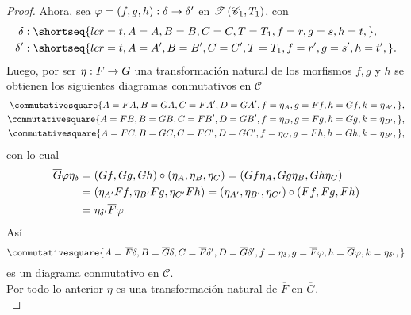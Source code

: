 \documentclass{article}
\begin{document}
\begin{enumerate}[label=\textbf{Ej \arabic*.}]
\begin{proof}
	 		Ahora, sea $\catarrow{\varphi=\lrprth{f,g,h}}{\delta}{\delta'}{}$ en $\mathscr{T}\left(\mathscr{C}_1,T_1\right)$, con 
	 		\begin{align*}
	 			\delta&:\shortseq{lcr=t,A=A,B=B,C=C,T=T_1,f=r,g=s,h=t,},\\
	 			\delta'&:\shortseq{lcr=t,A=A',B=B',C=C',T=T_1,f=r',g=s',h=t',}.
	 		\end{align*}
 			Luego, por ser $\catarrow{\eta}{F}{G}{}$ una transformación natural de los morfismos $f,g$ y $h$ se obtienen los siguientes diagramas conmutativos en $\mathscr{C}$
 			\begin{align*}
 				\commutativesquare{A=FA,B=GA,C=FA',D=GA',f=\eta_A,g=Ff,h=Gf,k=\eta_{A'},}&,\\
 				\commutativesquare{A=FB,B=GB,C=FB',D=GB',f=\eta_B,g=Fg,h=Gg,k=\eta_{B'},}&,\\
 				\commutativesquare{A=FC,B=GC,C=FC',D=GC',f=\eta_C,g=Fh,h=Gh,k=\eta_{B'},}&,
 			\end{align*}
 			con lo cual
	 		\begin{align*}
	 			\overline{G}\varphi\eta_\delta&=\left(Gf,Gg,Gh\right)\circ\left(\eta_A,\eta_B,\eta_C\right)=\left(Gf\eta_A,Gg\eta_B,Gh\eta_C\right)\\
	 			&=\left(\eta_{A'}Ff,\eta_{B'}Fg,\eta_{C'}Fh\right)=\left(\eta_{A'},\eta_{B'},\eta_{C'}\right)\circ\left(Ff,Fg,Fh\right)\\
	 			&=\eta_{\delta'}\overline{F}\varphi.
	 		\end{align*}
	 		Así
	 		\begin{equation*}
	 			\commutativesquare{A=\overline{F}\delta,B=\overline{G}\delta,C=\overline{F}\delta',D=\overline{G}\delta',f=\eta_\delta,g=\overline{F}\varphi,h=\overline{G}\varphi,k=\eta_{\delta'},}
	 		\end{equation*}
 		es un diagrama conmutativo en $\mathscr{C}$.\\
 		
 		Por todo lo anterior $\overline{\eta}$ es una transformación natural de $\overline{F}$ en $\overline{G}$.\\
		\end{proof}
	\end{enumerate}		
\end{document}
